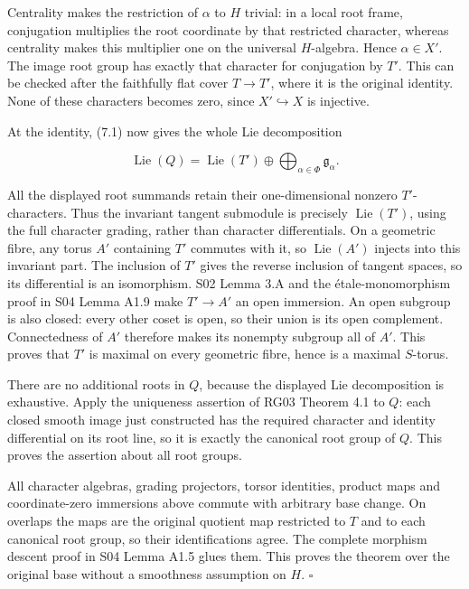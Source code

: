 \documentclass[11pt,a4paper,openany]{report}
\newcounter{none}
\begin{document}
Centrality makes the restriction of \(\alpha\) to \(H\) trivial: in a local root frame, conjugation multiplies the root coordinate by that restricted character, whereas centrality makes this multiplier one on the universal \(H\)-algebra. Hence \(\alpha\in X'\). The image root group has exactly that character for conjugation by \(T'\). This can be checked after the faithfully flat cover \(T\to T'\), where it is the original identity. None of these characters becomes zero, since \(X'\hookrightarrow X\) is injective.

At the identity, (7.1) now gives the whole Lie decomposition

\[
\operatorname{Lie}(Q)=\operatorname{Lie}(T')
\oplus\bigoplus_{\alpha\in\Phi}\mathfrak g_\alpha.
\]

All the displayed root summands retain their one-dimensional nonzero \(T'\)-characters. Thus the invariant tangent submodule is precisely \(\operatorname{Lie}(T')\), using the full character grading, rather than character differentials. On a geometric fibre, any torus \(A'\) containing \(T'\) commutes with it, so \(\operatorname{Lie}(A')\) injects into this invariant part. The inclusion of \(T'\) gives the reverse inclusion of tangent spaces, so its differential is an isomorphism. S02 Lemma 3.A and the étale-monomorphism proof in S04 Lemma A1.9 make \(T'\to A'\) an open immersion. An open subgroup is also closed: every other coset is open, so their union is its open complement. Connectedness of \(A'\) therefore makes its nonempty subgroup all of \(A'\). This proves that \(T'\) is maximal on every geometric fibre, hence is a maximal \(S\)-torus.

There are no additional roots in \(Q\), because the displayed Lie decomposition is exhaustive. Apply the uniqueness assertion of RG03 Theorem 4.1 to \(Q\): each closed smooth image just constructed has the required character and identity differential on its root line, so it is exactly the canonical root group of \(Q\). This proves the assertion about all root groups.

All character algebras, grading projectors, torsor identities, product maps and coordinate-zero immersions above commute with arbitrary base change. On overlaps the maps are the original quotient map restricted to \(T\) and to each canonical root group, so their identifications agree. The complete morphism descent proof in S04 Lemma A1.5 glues them. This proves the theorem over the original base without a smoothness assumption on \(H\). \(\square\)
\end{document}
